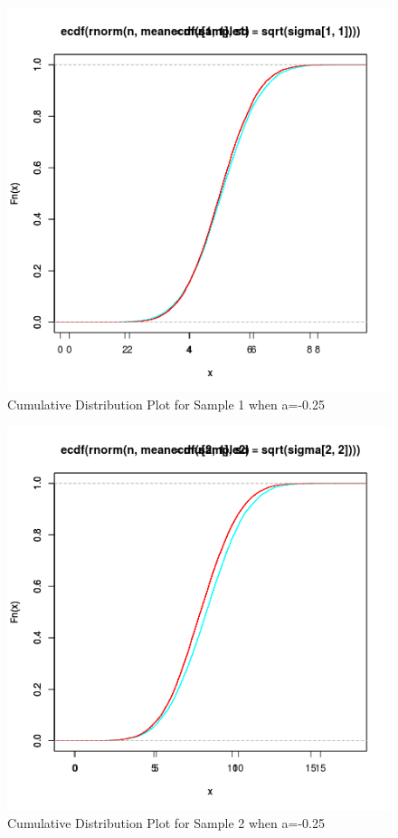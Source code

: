 \documentclass{article}
\begin{document}
			\begin{figure}[!ht]
  			\includegraphics[width=\linewidth]{pic/cdf_sample1_1.png}
 			 \caption{Cumulative Distribution Plot for Sample 1 when a=-0.25}
  			\label{fig:hist1_1}
		\end{figure}
		
		\begin{figure}[!ht]
  			\includegraphics[width=\linewidth]{pic/cdf_sample2_1.png}
 			 \caption{Cumulative Distribution Plot for Sample 2 when a=-0.25}
  			\label{fig:hist1_1}
  			\end{figure}
  			
\end{document}
